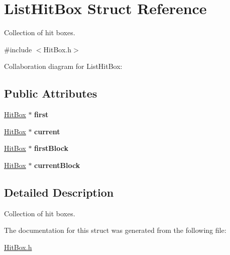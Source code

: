 \hypertarget{structListHitBox}{}\section{List\+Hit\+Box Struct Reference}
\label{structListHitBox}


Collection of hit boxes.  




{\ttfamily \#include $<$Hit\+Box.\+h$>$}



Collaboration diagram for List\+Hit\+Box\+:
\subsection*{Public Attributes}
\begin{DoxyCompactItemize}
\item 
\hyperlink{structHitBox}{Hit\+Box} $\ast$ {\bfseries first}\hypertarget{structListHitBox_ad74444cd226717237814eaeac80a875f}{}\label{structListHitBox_ad74444cd226717237814eaeac80a875f}

\item 
\hyperlink{structHitBox}{Hit\+Box} $\ast$ {\bfseries current}\hypertarget{structListHitBox_aca919adfe212d5525a9b24d9bd7d2a93}{}\label{structListHitBox_aca919adfe212d5525a9b24d9bd7d2a93}

\item 
\hyperlink{structHitBox}{Hit\+Box} $\ast$ {\bfseries first\+Block}\hypertarget{structListHitBox_a2086de15780fff764e013223601b8455}{}\label{structListHitBox_a2086de15780fff764e013223601b8455}

\item 
\hyperlink{structHitBox}{Hit\+Box} $\ast$ {\bfseries current\+Block}\hypertarget{structListHitBox_a5ecee29db2078182f88247b05cf13636}{}\label{structListHitBox_a5ecee29db2078182f88247b05cf13636}

\end{DoxyCompactItemize}


\subsection{Detailed Description}
Collection of hit boxes. 

The documentation for this struct was generated from the following file\+:\begin{DoxyCompactItemize}
\item 
\hyperlink{HitBox_8h}{Hit\+Box.\+h}\end{DoxyCompactItemize}
